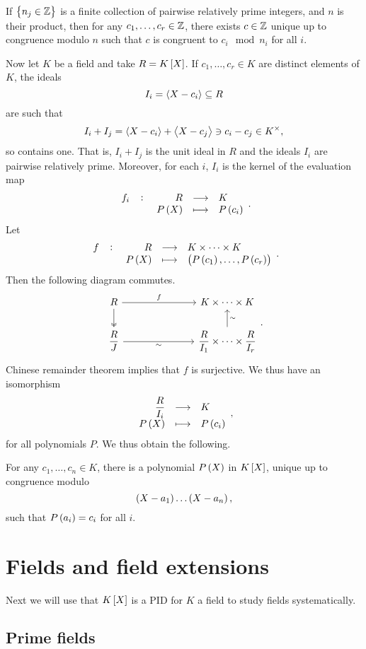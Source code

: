 \begin{theorem}
If $ \cbr{n_j \in \Z} $ is a finite collection of pairwise relatively prime integers, and $ n $ is their product, then for any $ c_1, \dots, c_r \in \mathbb{Z} $, there exists $ c \in \mathbb{Z} $ unique up to congruence modulo $ n $ such that $ c $ is congruent to $ c_i \mod n_i $ for all $ i $.
\end{theorem}

Now let $ K $ be a field and take $ R = K\sbr{X} $. If $ c_1, \dots, c_r \in K $ are distinct elements of $ K $, the ideals
$$ I_i = \left\langle X - c_i \right\rangle \subseteq R $$
are such that
$$ I_i + I_j = \left\langle X - c_i \right\rangle + \left\langle X - c_j \right\rangle \ni c_i - c_j \in K^\times, $$
so contains one. That is, $ I_i + I_j $ is the unit ideal in $ R $ and the ideals $ I_i $ are pairwise relatively prime. Moreover, for each $ i $, $ I_i $ is the kernel of the evaluation map
$$ \function[f_i]{R}{K}{P\br{X}}{P\br{c_i}}. $$
Let
$$ \function[f]{R}{K \times \dots \times K}{P\br{X}}{\br{P\br{c_1}, \dots, P\br{c_r}}}. $$
Then the following diagram commutes.
$$
\begin{tikzcd}[column sep=1in]
R \arrow{r}{f} \arrow[twoheadrightarrow]{d} & K \times \dots \times K \\
\dfrac{R}{J} \arrow[swap]{r}{\sim} & \dfrac{R}{I_1} \times \dots \times \dfrac{R}{I_r} \arrow[swap]{u}{\sim}
\end{tikzcd}.
$$
Chinese remainder theorem implies that $ f $ is surjective. We thus have an isomorphism
$$ \function{\dfrac{R}{I_i}}{K}{P\br{X}}{P\br{c_i}}, $$
for all polynomials $ P $. We thus obtain the following.

\begin{theorem}
For any $ c_1, \dots, c_n \in K $, there is a polynomial $ P\br{X} $ in $ K\sbr{X} $, unique up to congruence modulo
$$ \br{X - a_1} \dots \br{X - a_n}, $$
such that $ P\br{a_i} = c_i $ for all $ i $.
\end{theorem}

\pagebreak

\section{Fields and field extensions}


Next we will use that $ K\sbr{X} $ is a PID for $ K $ a field to study fields systematically.

\subsection{Prime fields}

